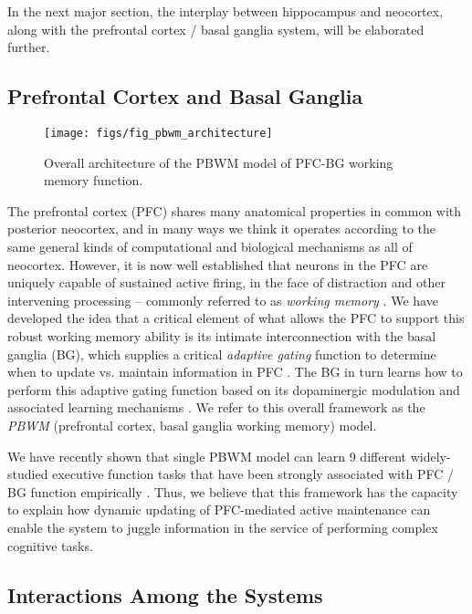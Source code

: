 \documentclass[11pt,twoside]{article}
\newif\myifpdf
\begin{document}
In the next major section, the interplay between hippocampus and neocortex, along with the prefrontal cortex / basal ganglia system, will be elaborated further.

\subsection{Prefrontal Cortex and Basal Ganglia}

\begin{figure}
  \centering\texttt{[image: figs/fig\_pbwm\_architecture]}
  \caption{\small Overall architecture of the PBWM model of PFC-BG working memory function.}
  \label{fig.pbwm}
\end{figure}

The prefrontal cortex (PFC) shares many anatomical properties in common with posterior neocortex, and in many ways we think it operates according to the same general kinds of computational and biological mechanisms as all of neocortex.  However, it is now well established that neurons in the PFC are uniquely capable of sustained active firing, in the face of distraction and other intervening processing -- commonly referred to as {\em working memory} \cite{FusterAlexander71,Goldman-Rakic87,Baddeley86,MiyakeShah99}.  We have developed the idea that a critical element of what allows the PFC to support this robust working memory ability is its intimate interconnection with the basal ganglia (BG), which supplies a critical {\em adaptive gating} function to determine when to update vs. maintain information in PFC \cite{FrankLoughryOReilly01,OReillyFrank06,OReilly06}.  The BG in turn learns how to perform this adaptive gating function based on its dopaminergic modulation and associated learning mechanisms \cite{Frank05,OReillyFrank06}.  We refer to this overall framework as the {\em PBWM} (prefrontal cortex, basal ganglia working memory) model.

We have recently shown that single PBWM model can learn 9 different widely-studied executive function tasks that have been strongly associated with PFC / BG function empirically \cite{FriedmanHerdHazyEtAl}.  Thus, we believe that this framework has the capacity to explain how dynamic updating of PFC-mediated active maintenance can enable the system to juggle information in the service of performing complex cognitive tasks.

\subsection{Interactions Among the Systems}
\end{document}
